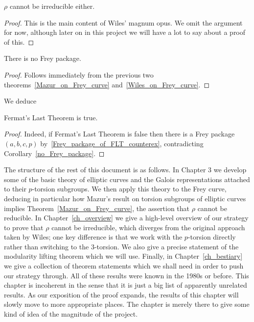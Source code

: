 \begin{theorem}\label{FLT.FreyCurve.Wiles_Frey}\leanok $\rho$ cannot be irreducible either.\end{theorem}
\begin{proof}\tangled This is the main content of Wiles' magnum opus. We omit the argument for now, although later on in this project we will have a lot to say about a proof of this.
\end{proof}

\begin{corollary}\label{FLT.Frey_package.false}\leanok There is no Frey package.\end{corollary}
\begin{proof}\leanok Follows immediately from the previous two theorems~\ref{Mazur_on_Frey_curve} and~\ref{Wiles_on_Frey_curve}.\end{proof}

We deduce

\begin{corollary}\label{FLT}\leanok Fermat's Last Theorem is true.\end{corollary}
\begin{proof}\leanok
Indeed, if Fermat's Last Theorem is false then there is a Frey package $(a,b,c,p)$ by~\ref{Frey_package_of_FLT_counterex}, contradicting Corollary~\ref{no_Frey_package}.
\end{proof}

The structure of the rest of this document is as follows. In Chapter 3 we develop some of the basic theory of elliptic curves and the Galois representations attached to their $p$-torsion subgroups. We then apply this theory to the Frey curve, deducing in particular how Mazur's result on torsion subgroups of elliptic curves implies Theorem~\ref{Mazur_on_Frey_curve}, the assertion that $\rho$ cannot be reducible. In Chapter~\ref{ch_overview} we give a high-level overview of our strategy to prove that $\rho$ cannot be irreducible, which diverges from the original approach taken by Wiles; one key difference is that we work with the $p$-torsion directly rather than switching to the 3-torsion. We also give a precise statement of the modularity lifting theorem which we will use. Finally, in Chapter~\ref{ch_bestiary} we give a collection of theorem statements which we shall need in order to push our strategy through. All of these results were known in the 1980s or before. This chapter is incoherent in the sense that it is just a big list of apparently unrelated results. As our exposition of the proof expands, the results of this chapter will slowly move to more appropriate places. The chapter is merely there to give some kind of idea of the magnitude of the project.
